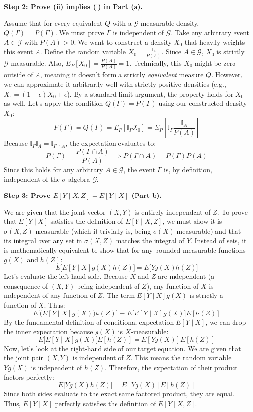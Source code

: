 \begin{solution}
\textbf{Step 2: Prove (ii) implies (i) in Part (a).}

Assume that for every equivalent $Q$ with a $\mathcal{G}$-measurable density, $Q(\Gamma) = P(\Gamma)$. We must prove $\Gamma$ is independent of $\mathcal{G}$.
Take any arbitrary event $A \in \mathcal{G}$ with $P(A) > 0$. We want to construct a density $X_0$ that heavily weights this event $A$.
Define the random variable $X_0 = \frac{\mathbb{I}_A}{P(A)}$. Since $A \in \mathcal{G}$, $X_0$ is strictly $\mathcal{G}$-measurable. Also, $E_P[X_0] = \frac{P(A)}{P(A)} = 1$.
Technically, this $X_0$ might be zero outside of $A$, meaning it doesn't form a strictly \textit{equivalent} measure $Q$. However, we can approximate it arbitrarily well with strictly positive densities (e.g., $X_\epsilon = (1-\epsilon)X_0 + \epsilon$). By a standard limit argument, the property holds for $X_0$ as well.
Let's apply the condition $Q(\Gamma) = P(\Gamma)$ using our constructed density $X_0$:
\[ P(\Gamma) = Q(\Gamma) = E_P[\mathbb{I}_\Gamma X_0] = E_P\left[\mathbb{I}_\Gamma \frac{\mathbb{I}_A}{P(A)}\right] \]
Because $\mathbb{I}_\Gamma \mathbb{I}_A = \mathbb{I}_{\Gamma \cap A}$, the expectation evaluates to:
\[ P(\Gamma) = \frac{P(\Gamma \cap A)}{P(A)} \implies P(\Gamma \cap A) = P(\Gamma) P(A) \]
Since this holds for any arbitrary $A \in \mathcal{G}$, the event $\Gamma$ is, by definition, independent of the $\sigma$-algebra $\mathcal{G}$.

\textbf{Step 3: Prove $E[Y \mid X, Z] = E[Y \mid X]$ (Part b).}

We are given that the joint vector $(X,Y)$ is entirely independent of $Z$.
To prove that $E[Y \mid X]$ satisfies the definition of $E[Y \mid X, Z]$, we must show it is $\sigma(X,Z)$-measurable (which it trivially is, being $\sigma(X)$-measurable) and that its integral over any set in $\sigma(X,Z)$ matches the integral of $Y$.
Instead of sets, it is mathematically equivalent to show that for any bounded measurable functions $g(X)$ and $h(Z)$:
\[ E\Big[ E[Y \mid X] g(X) h(Z) \Big] = E\Big[ Y g(X) h(Z) \Big] \]
Let's evaluate the left-hand side. Because $X$ and $Z$ are independent (a consequence of $(X,Y)$ being independent of $Z$), any function of $X$ is independent of any function of $Z$. The term $E[Y \mid X] g(X)$ is strictly a function of $X$. Thus:
\[ E\Big[ \big(E[Y \mid X] g(X)\big) h(Z) \Big] = E\Big[ E[Y \mid X] g(X) \Big] E[h(Z)] \]
By the fundamental definition of conditional expectation $E[Y \mid X]$, we can drop the inner expectation because $g(X)$ is $X$-measurable:
\[ E\Big[ E[Y \mid X] g(X) \Big] E[h(Z)] = E[ Y g(X) ] E[h(Z)] \]
Now, let's look at the right-hand side of our target equation. We are given that the joint pair $(X, Y)$ is independent of $Z$. This means the random variable $Y g(X)$ is independent of $h(Z)$.
Therefore, the expectation of their product factors perfectly:
\[ E\Big[ Y g(X) h(Z) \Big] = E[ Y g(X) ] E[ h(Z) ] \]
Since both sides evaluate to the exact same factored product, they are equal. Thus, $E[Y \mid X]$ perfectly satisfies the definition of $E[Y \mid X, Z]$.
\end{solution}


